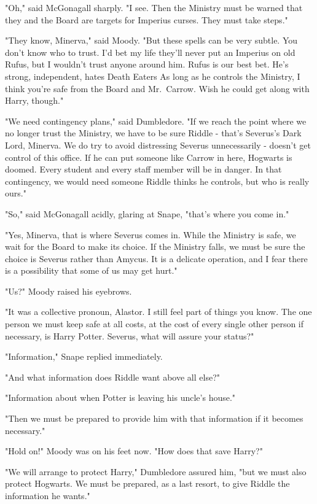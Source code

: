 "Oh," said McGonagall sharply. "I see. Then the Ministry must be warned that they and the Board are targets for Imperius curses. They must take steps."

"They know, Minerva," said Moody. "But these spells can be very subtle. You don't know who to trust. I'd bet my life they'll never put an Imperius on old Rufus, but I wouldn't trust anyone around him. Rufus is our best bet. He's strong, independent, hates Death Eaters{\el} As long as he controls the Ministry, I think you're safe from the Board and Mr.~Carrow. Wish he could get along with Harry, though."

"We need contingency plans," said Dumbledore. "If we reach the point where we no longer trust the Ministry, we have to be sure Riddle - that's Severus's Dark Lord, Minerva. We do try to avoid distressing Severus unnecessarily - doesn't get control of this office. If he can put someone like Carrow in here, Hogwarts is doomed. Every student and every staff member will be in danger. In that contingency, we would need someone Riddle thinks he controls, but who is really ours."

"So," said McGonagall acidly, glaring at Snape, "that's where you come in."

"Yes, Minerva, that is where Severus comes in. While the Ministry is safe, we wait for the Board to make its choice. If the Ministry falls, we must be sure the choice is Severus rather than Amycus. It is a delicate operation, and I fear there is a possibility that some of us may get hurt."

"Us?" Moody raised his eyebrows.

"It was a collective pronoun, Alastor. I still feel part of things you know. The one person we must keep safe at all costs, at the cost of every single other person if necessary, is Harry Potter. Severus, what will assure your status?"

"Information," Snape replied immediately.

"And what information does Riddle want above all else?"

"Information about when Potter is leaving his uncle's house."

"Then we must be prepared to provide him with that information if it becomes necessary."

"Hold on!" Moody was on his feet now. "How does that save Harry?"

"We will arrange to protect Harry," Dumbledore assured him, "but we must also protect Hogwarts. We must be prepared, as a last resort, to give Riddle the information he wants."

